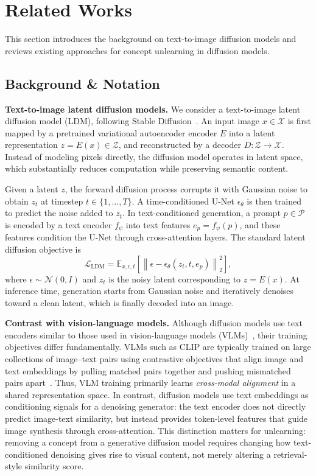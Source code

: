 \section{Related Works}
This section introduces the background on text-to-image diffusion models and reviews existing approaches for concept unlearning in diffusion models.
\subsection{Background \& Notation}
\textbf{Text-to-image latent diffusion models.}
We consider a text-to-image latent diffusion model (LDM), following Stable Diffusion~\citep{rombach2022high}. 
An input image $x \in \mathcal{X}$ is first mapped by a pretrained variational autoencoder encoder $E$ into a latent representation $z = E(x) \in \mathcal{Z}$, and reconstructed by a decoder $D : \mathcal{Z} \rightarrow \mathcal{X}$. 
Instead of modeling pixels directly, the diffusion model operates in latent space, which substantially reduces computation while preserving semantic content.

Given a latent $z$, the forward diffusion process corrupts it with Gaussian noise to obtain $z_t$ at timestep $t \in \{1,\dots,T\}$. 
A time-conditioned U-Net $\epsilon_\theta$ is then trained to predict the noise added to $z_t$. 
In text-conditioned generation, a prompt $p \in \mathcal{P}$ is encoded by a text encoder $f_{\psi}$ into text features $e_p = f_{\psi}(p)$, and these features condition the U-Net through cross-attention layers. 
The standard latent diffusion objective is
\begin{equation}
\mathcal{L}_{\mathrm{LDM}}
=
\mathbb{E}_{x,\epsilon,t}
\left[
\left\|
\epsilon - \epsilon_\theta(z_t, t, e_p)
\right\|_2^2
\right],
\end{equation}
where $\epsilon \sim \mathcal{N}(0,I)$ and $z_t$ is the noisy latent corresponding to $z = E(x)$.
At inference time, generation starts from Gaussian noise and iteratively denoises toward a clean latent, which is finally decoded into an image.

\textbf{Contrast with vision-language models.}
Although diffusion models use text encoders similar to those used in vision-language models (VLMs)~\citep{radford2021learning}, their training objectives differ fundamentally.
VLMs such as CLIP are typically trained on large collections of image--text pairs using contrastive objectives that align image and text embeddings by pulling matched pairs together and pushing mismatched pairs apart~\citep{radford2021learning,zhang2024vision}. 
Thus, VLM training primarily learns \emph{cross-modal alignment} in a shared representation space.
In contrast, diffusion models use text embeddings as conditioning signals for a denoising generator: the text encoder does not directly predict image-text similarity, but instead provides token-level features that guide image synthesis through cross-attention.
This distinction matters for unlearning: removing a concept from a generative diffusion model requires changing how text-conditioned denoising gives rise to visual content, not merely altering a retrieval-style similarity score.


